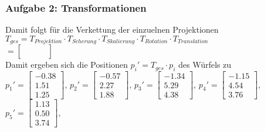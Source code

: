 \documentclass[accentcolor=tud9c,colorbacktitle,inverttitle,landscape,german,presentation,t]{tudbeamer}
\begin{document}
\begin{frame}
	\frametitle{Aufgabe 2: Transformationen}
	Damit folgt für die Verkettung der einzuelnen Projektionen\\
	$T_{ges}=T_{Projektion} \cdot T_{Scherung} \cdot T_{Skalierung} \cdot T_{Rotation} \cdot T_{Translation}$\\
	$=\begin{bmatrix}
	 &  &  & \\
	 &  &  & \\
	 &  &  & \\
	 &  &  & 
	\end{bmatrix}$\\
	Damit ergeben sich die Positionen $p_i'=T_{ges} \cdot p_i $ des Würfels zu\\
	{\small 
	$p_1'=\begin{bmatrix}  -0.38\\1.51 \\1.25 \end{bmatrix}$, %
	$p_2'=\begin{bmatrix}  -0.57\\2.27 \\1.88 \end{bmatrix}$, %
	$p_3'=\begin{bmatrix}  -1.34\\5.29 \\4.38 \end{bmatrix}$, %
	$p_4'=\begin{bmatrix}  -1.15\\4.54 \\3.76 \end{bmatrix}$,\\ %
	$p_5'=\begin{bmatrix}  1.13\\0.50 \\3.74 \end{bmatrix}$, %
}
\end{frame}
\end{document}
